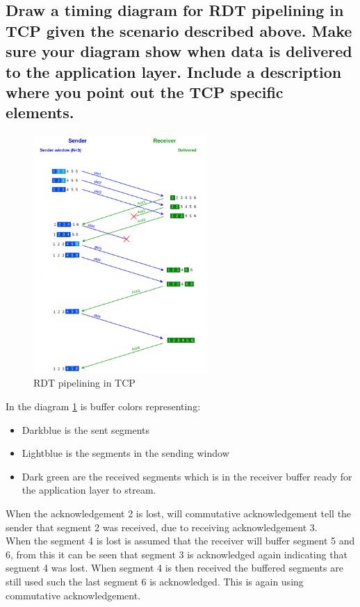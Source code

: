 \documentclass[12pt, a4paper]{article}
\begin{document}
		\subsection{Draw a timing diagram for RDT pipelining in TCP given the scenario described above. Make sure your diagram show when data is delivered to the application layer. Include a description where you point out the TCP specific elements.}
		\begin{figure}[h]
			\centering
			\includegraphics[width=250px]{assets/RDT.png}
			\caption{RDT pipelining in TCP}
			\label{fig:RDT}
		\end{figure}
		In the diagram \ref{fig:RDT} is buffer colors representing:
		\begin{itemize}
			\item Darkblue is the sent segments
			\item Lightblue is the segments in the sending window 
			\item Dark green are the received segments which is in the receiver buffer ready for the application layer to stream.
		\end{itemize}
		When the acknowledgement 2 is lost, will commutative acknowledgement tell the sender that segment 2 was received, due to receiving acknowledgement 3.\\
		When the segment 4 is lost is assumed that the receiver will buffer segment 5 and 6, from this it can be seen that segment 3 is acknowledged again indicating that segment 4 was lost. When segment 4 is then received the buffered segments are still used such the last segment 6 is acknowledged. This is again using commutative acknowledgement.
\end{document}
